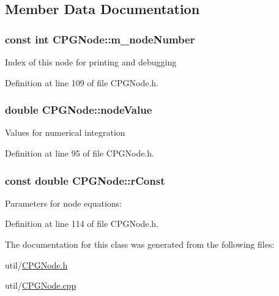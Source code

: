 \subsection{Member Data Documentation}
\hypertarget{class_c_p_g_node_ac770248ea013b912e62f51a994c1490f}{
\subsubsection[{m\-\_\-node\-Number}]{\setlength{\rightskip}{0pt plus 5cm}const int C\-P\-G\-Node\-::m\-\_\-node\-Number\hspace{0.3cm}{\ttfamily [protected]}}}\label{class_c_p_g_node_ac770248ea013b912e62f51a994c1490f}
Index of this node for printing and debugging 

Definition at line 109 of file C\-P\-G\-Node.\-h.

\hypertarget{class_c_p_g_node_acbbfdd599bfd15220fe953961fbfeb4f}{
\subsubsection[{node\-Value}]{\setlength{\rightskip}{0pt plus 5cm}double C\-P\-G\-Node\-::node\-Value}}\label{class_c_p_g_node_acbbfdd599bfd15220fe953961fbfeb4f}
Values for numerical integration 

Definition at line 95 of file C\-P\-G\-Node.\-h.

\hypertarget{class_c_p_g_node_a971fd2b7f0d4c7ac565d2a94ec84f7c5}{
\subsubsection[{r\-Const}]{\setlength{\rightskip}{0pt plus 5cm}const double C\-P\-G\-Node\-::r\-Const\hspace{0.3cm}{\ttfamily [protected]}}}\label{class_c_p_g_node_a971fd2b7f0d4c7ac565d2a94ec84f7c5}
Parameters for node equations\-: 

Definition at line 114 of file C\-P\-G\-Node.\-h.



The documentation for this class was generated from the following files\-:\begin{DoxyCompactItemize}
\item 
util/\hyperlink{_c_p_g_node_8h}{C\-P\-G\-Node.\-h}\item 
util/\hyperlink{_c_p_g_node_8cpp}{C\-P\-G\-Node.\-cpp}\end{DoxyCompactItemize}
